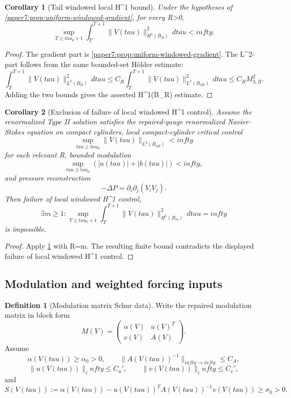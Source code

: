 \documentclass[11pt]{amsart}
\def\({}%
\def\){}%
\def\tau{tau}%
\def\infty{infty}%
\theoremstyle{plain}
\newtheorem{corollary}[corollary]{Corollary}
\theoremstyle{definition}
\newtheorem{definition}[definition]{Definition}
\theoremstyle{remark}
\begin{document}
\begin{corollary}[Tail windowed local \(H^1\) bound]\label{paper7:cor:windowed-h1}
Under the hypotheses of \cref{paper7:prop:uniform-windowed-gradient}, for
every \(R>0\),
\[
  \sup_{T\ge\tau_0+1}
  \int_T^{T+1}\|V(\tau)\|_{H^1(B_R)}^2\,d\tau<\infty.
\]
\end{corollary}

\begin{proof}
The gradient part is \cref{paper7:prop:uniform-windowed-gradient}.  The
\(L^2\)-part follows from the same bounded-set H\"older estimate:
\[
  \int_T^{T+1}\|V(\tau)\|_{L^2(B_R)}^2\,d\tau
  \le
  C_R\int_T^{T+1}\|V(\tau)\|_{L^3(B_{2R})}^2\,d\tau
  \le C_RM_{3,R}^2.
\]
Adding the two bounds gives the asserted \(H^1(B_R)\) estimate.
\end{proof}

\begin{corollary}[Exclusion of failure of local windowed \(H^1\) control]
\label{paper7:cor:windowed-h1-exclusion-tail}
Assume the renormalized Type II solution satisfies the repaired-gauge
renormalized Navier--Stokes equation on compact cylinders, local
compact-cylinder critical control
\[
  \sup_{\tau\ge\tau_0}\|V(\tau)\|_{L^3(B_{2R})}<\infty
\]
for each relevant \(R\), bounded modulation
\[
  \sup_{\tau\ge\tau_0}(|a(\tau)|+|b(\tau)|)<\infty,
\]
and pressure reconstruction
\[
  -\Delta P=\partial_i\partial_j(V_iV_j).
\]
Then failure of local windowed \(H^1\) control,
\[
  \exists m\ge1:
  \sup_{T\ge\tau_0+1}
  \int_T^{T+1}\|V(\tau)\|_{H^1(B_m)}^2\,d\tau=\infty
\]
is impossible.
\end{corollary}

\begin{proof}
Apply \cref{paper7:cor:windowed-h1} with \(R=m\).  The resulting finite bound
contradicts the displayed failure of local windowed \(H^1\) control.
\end{proof}

\subsection{Modulation and weighted forcing inputs}

\begin{definition}[Modulation matrix Schur data]\label{paper7:def:modmatrix-schur}
Write the repaired modulation matrix in block form
\[
  M(V)=
  \begin{pmatrix}
  \alpha(V)&u(V)^T\\
  v(V)&A(V)
  \end{pmatrix}.
\]
Assume
\[
  \alpha(V(\tau))\ge \alpha_0>0,\qquad
  \|A(V(\tau))^{-1}\|_{\infty\to\infty}\le C_A,
\]
\[
  \|u(V(\tau))\|_\infty\le C_u',
  \qquad
  \|v(V(\tau))\|_\infty\le C_v',
\]
and
\[
  S(V(\tau)):=
  \alpha(V(\tau))-u(V(\tau))^TA(V(\tau))^{-1}v(V(\tau))
  \ge\sigma_0>0.
\]
\end{definition}
\end{document}
